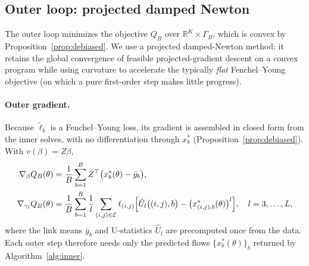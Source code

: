 \documentclass[12pt]{article}
\newcommand{\cE}{\mathcal{E}}
\begin{document}
\subsection{Outer loop: projected damped Newton}\label{sec:outer-loop}

The outer loop minimizes the objective $Q_B$ over $\mathbb{R}^K \times \Gamma_B$, which is convex by Proposition~\ref{prop:debiased}. We use a projected damped-Newton method: it retains the global convergence of feasible projected-gradient descent on a convex program while using curvature to accelerate the typically \emph{flat} Fenchel--Young objective (on which a pure first-order step makes little progress).

\paragraph{Outer gradient.} Because $\tilde\ell_b$ is a Fenchel--Young loss, its gradient is assembled in closed form from the inner solves, with no differentiation through $x^*_b$ (Proposition~\ref{prop:debiased}). With $v(\beta) = Z\beta$,
\begin{equation}\label{eq:outer-gradient}
\begin{aligned}
    \nabla_\beta Q_B(\theta) &= \frac{1}{B}\sum_{b=1}^B Z^\top\bigl(x^*_b(\theta) - \bar y_b\bigr), \\
    \nabla_{\gamma_l} Q_B(\theta) &= \frac{1}{B}\sum_{b=1}^B \frac{1}{l}\sum_{(i,j)\in\cE} \ell_{(i,j)}\Bigl[\hat U_l\bigl((i,j),b\bigr) - \bigl(x^*_{(i,j),b}(\theta)\bigr)^l\Bigr], \quad l = 3,\dots,L,
\end{aligned}
\end{equation}
where the link means $\bar y_b$ and U-statistics $\hat U_l$ are precomputed once from the data. Each outer step therefore needs only the predicted flows $\{x^*_b(\theta)\}_b$ returned by Algorithm~\ref{alg:inner}.
\end{document}
